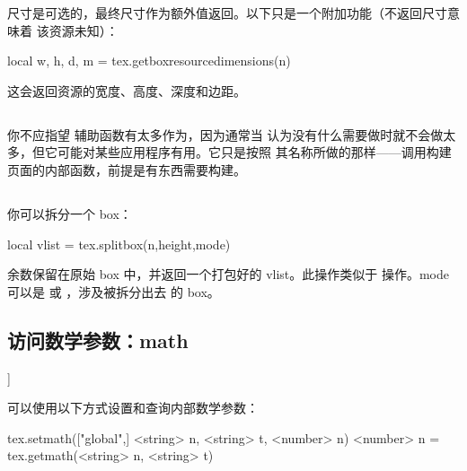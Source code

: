 尺寸是可选的，最终尺寸作为额外值返回。以下只是一个附加功能（不返回尺寸意味着
该资源未知）：

\begin{typing}
local w, h, d, m = tex.getboxresourcedimensions(n)
\end{typing}

这会返回资源的宽度、高度、深度和边距。

\subsection{}



你不应指望  辅助函数有太多作为，因为通常当 \TEX
认为没有什么需要做时就不会做太多，但它可能对某些应用程序有用。它只是按照
其名称所做的那样——调用构建页面的内部函数，前提是有东西需要构建。

\subsection{}



你可以拆分一个 box：

\begin{typing}
local vlist = tex.splitbox(n,height,mode)
\end{typing}

余数保留在原始 box 中，并返回一个打包好的 vlist。此操作类似于 
操作。mode 可以是  或 ，涉及被拆分出去
的 box。

\subsection{{访问数学参数：\type {[get|set}math}}]



可以使用以下方式设置和查询内部数学参数：

\begin{typing}
tex.setmath(["global",] <string> n, <string> t, <number> n)
<number> n = tex.getmath(<string> n, <string> t)
\end{typing}

